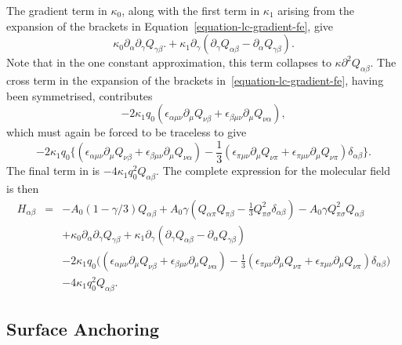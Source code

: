 The gradient term in $\kappa_0$, along with the first term in $\kappa_1$
arising from the expansion of the brackets in
Equation~\ref{equation-lc-gradient-fe}, give
\begin{equation}
\kappa_0 \partial_\alpha \partial_\gamma Q_{\gamma\beta}.
+
\kappa_1 \partial_\gamma
( \partial_\gamma Q_{\alpha\beta} - \partial_\alpha Q_{\gamma\beta}).
\nonumber
\end{equation}
Note that in the one constant approximation, this term collapses
to $\kappa \partial^2 Q_{\alpha\beta}$. The cross term in the expansion
of the brackets in~\ref{equation-lc-gradient-fe}, having been symmetrised,
contributes
\begin{equation}
-2\kappa_1 q_0
( \epsilon_{\alpha\mu\nu} \partial_\mu Q_{\nu\beta}
+ \epsilon_{\beta\mu\nu} \partial_\mu Q_{\nu\alpha}),
\nonumber
\end{equation}
which must again be forced to be traceless to give
\begin{equation}
-2\kappa_1 q_0 \big\{
( \epsilon_{\alpha\mu\nu} \partial_\mu Q_{\nu\beta}
+ \epsilon_{\beta\mu\nu} \partial_\mu Q_{\nu\alpha})
- {\textstyle\frac{1}{3}}( 
   \epsilon_{\pi\mu\nu} \partial_\mu Q_{\nu\pi}
  +\epsilon_{\pi\mu\nu} \partial_\mu Q_{\nu\pi} )
   \delta_{\alpha\beta} \big\}.
\nonumber
\end{equation}
The final term in is
$-4 \kappa_1 q_0^2 Q_{\alpha\beta}$. The complete expression for the molecular
field is then
\begin{eqnarray}
\label{eq-lc-h-full}
H_{\alpha\beta} &=&
- A_0 (1 - \gamma/3) Q_{\alpha\beta}
+ A_0 \gamma (Q_{\alpha\pi} Q_{\pi\beta}
               - {\textstyle\frac{1}{3}} Q_{\pi\sigma}^2\delta_{\alpha\beta})
- A_0 \gamma Q_{\pi\sigma}^2 Q_{\alpha\beta}
\nonumber\\
&&
+\kappa_0 \partial_\alpha \partial_\gamma Q_{\gamma\beta}
+
\kappa_1 \partial_\gamma
( \partial_\gamma Q_{\alpha\beta} - \partial_\alpha Q_{\gamma\beta})
\nonumber\\
&&
-2\kappa_1 q_0 \big(
( \epsilon_{\alpha\mu\nu} \partial_\mu Q_{\nu\beta}
+ \epsilon_{\beta\mu\nu} \partial_\mu Q_{\nu\alpha})
- {\textstyle\frac{1}{3}}( 
   \epsilon_{\pi\mu\nu} \partial_\mu Q_{\nu\pi}
  +\epsilon_{\pi\mu\nu} \partial_\mu Q_{\nu\pi} )
   \delta_{\alpha\beta} \big)
\nonumber\\
&& - 4 \kappa_1 q_0^2 Q_{\alpha\beta}.
\end{eqnarray}


\subsection{Surface Anchoring}

